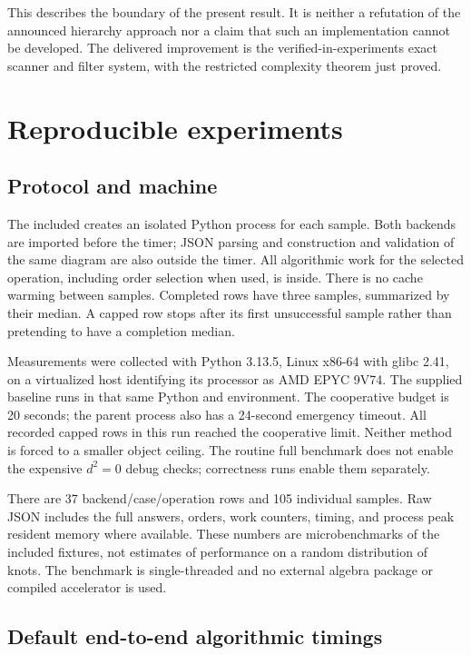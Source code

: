 \documentclass[11pt]{article}
\theoremstyle{definition}\newtheorem{definition}[theorem]{Definition}
\theoremstyle{remark}\newtheorem{remark}[theorem]{Remark}
\newcommand{\code}[1]{\texttt{\detokenize{#1}}}
\begin{document}
This describes the boundary of the present result. It is neither a
refutation of the announced hierarchy approach nor a claim that such an
implementation cannot be developed. The delivered improvement is the
verified-in-experiments exact scanner and filter system, with the restricted
complexity theorem just proved.

\section{Reproducible experiments}
\label{sec:experiments}

\subsection{Protocol and machine}

The included \code{tools/benchmark.py} creates an isolated Python process for
each sample. Both backends are imported before the timer; JSON parsing and
construction and validation of the same diagram are also outside the timer.
All algorithmic work for the selected operation, including order selection
when used, is inside. There is no cache warming between samples. Completed
rows have three samples, summarized by their median. A capped row stops after
its first unsuccessful sample rather than pretending to have a completion
median.

Measurements were collected with Python 3.13.5, Linux x86-64 with glibc 2.41,
on a virtualized host identifying its processor as AMD EPYC 9V74. The supplied
baseline runs in that same Python and environment. The cooperative budget is
20 seconds; the parent process also has a 24-second emergency timeout.
All recorded capped rows in this run reached the cooperative limit. Neither
method is forced to a smaller object ceiling. The routine full benchmark does
not enable the expensive $d^2=0$ debug checks; correctness runs enable them
separately.

There are 37 backend/case/operation rows and 105 individual samples. Raw
JSON includes the full answers, orders, work counters, timing, and process
peak resident memory where available. These numbers are microbenchmarks of
the included fixtures, not estimates of performance on a random distribution
of knots. The benchmark is single-threaded and no external algebra package
or compiled accelerator is used.

\subsection{Default end-to-end algorithmic timings}
\end{document}
